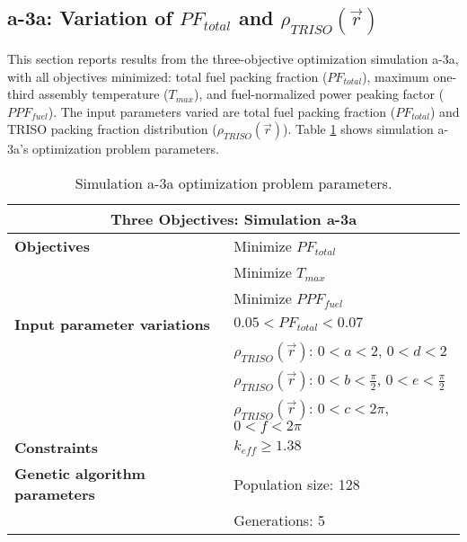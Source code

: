 \subsection{a-3a: Variation of $PF_{total}$ and $\rho_{TRISO}(\vec{r})$}
\label{sec:a-3a}
This section reports results from the three-objective optimization simulation a-3a, 
with all objectives minimized: total fuel packing fraction ($PF_{total}$), 
maximum one-third assembly temperature ($T_{max}$), and fuel-normalized power peaking 
factor ($PPF_{fuel}$).  
The input parameters varied are total fuel packing fraction ($PF_{total}$) and 
TRISO packing fraction distribution ($\rho_{TRISO}(\vec{r})$). 
Table \ref{tab:simulationa3a} shows simulation a-3a's optimization problem parameters. 
\begin{table}[htbp!]
    \centering
    \onehalfspacing
    \caption{Simulation a-3a optimization problem parameters.}
	\label{tab:simulationa3a}
    \footnotesize
    \begin{tabular}{l|p{5.3cm}}
    \hline 
    \multicolumn{2}{c}{\textbf{Three Objectives: Simulation a-3a}} \\
    \hline 
    \textbf{Objectives} & Minimize $PF_{total}$ \\
    & Minimize $T_{max}$ \\
    & Minimize $PPF_{fuel}$ \\
    \hline 
    \textbf{Input parameter variations} & $0.05<PF_{total}<0.07$ \\
    & $\rho_{TRISO}(\vec{r})$: $0<a<2$, $0<d<2$\\
    & $\rho_{TRISO}(\vec{r})$: $0<b<\frac{\pi}{2}$, $0<e<\frac{\pi}{2}$\\
    & $\rho_{TRISO}(\vec{r})$: $0<c<2\pi$, $0<f<2\pi$\\
    \hline
    \textbf{Constraints} & $k_{eff} \geq 1.38$\\ 
    \hline 
    \textbf{Genetic algorithm parameters} & Population size: 128 \\
    & Generations: 5 \\
    \hline
    \end{tabular}
\end{table}

